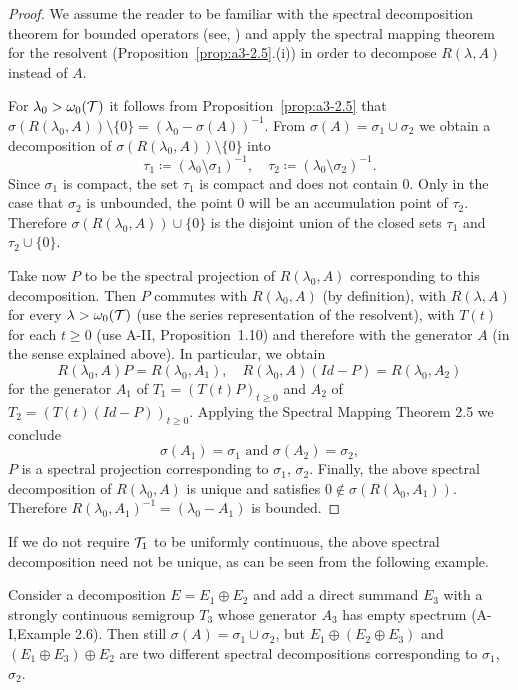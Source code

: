 \begin{proof}
We assume the reader to be familiar with the spectral decomposition theorem for bounded operators (see, \eg \citet[p.572]{dunfordschwartz:1958}) and apply the spectral mapping theorem for the resolvent (Proposition~\ref{prop:a3-2.5}.(i)) in order to decompose $R(\lambda,A)$ instead of $A$.

For $\lambda_{0} > \omega_{0}(\mathcal{T})$ it follows from Proposition~\ref{prop:a3-2.5} that $\sigma(R(\lambda_{0},A)) \setminus \{0\} = (\lambda_{0} - \sigma(A))^{-1}$.
From $\sigma(A) = \sigma_{1} \cup \sigma_{2}$ we obtain a decomposition of $\sigma(R(\lambda_{0},A)) \setminus \{0\}$ into
\[
	\tau_{1} \coloneqq (\lambda_{0} \setminus \sigma_{1})^{-1}, 
		\quad 
	\tau_{2} \coloneqq (\lambda_{0} \setminus \sigma_{2})^{-1} .
\]
Since $\sigma_{1}$ is compact, the set $\tau_{1}$ is compact and does not contain $0$.
Only in the case that $\sigma_{2}$ is unbounded, the point $0$ will be an accumulation point of $\tau_{2}$.
Therefore $\sigma(R(\lambda_{0},A)) \cup \{0\}$ is the disjoint union of the closed sets $\tau_{1}$ and $\tau_{2} \cup \{0\}$.

Take now $P$ to be the spectral projection of $R(\lambda_{0},A)$ corresponding to this decomposition.
Then $P$ commutes with $R(\lambda_{0},A)$ (by definition), with $R(\lambda,A)$ for every $\lambda > \omega_{0}(\mathcal{T})$ (use the series representation of the resolvent), with $T(t)$ for each $t \geq 0$ (use A-II, Proposition~1.10) and therefore with the generator $A$ (in the sense explained above).
In particular, we obtain
\[
R(\lambda_{0},A)P = R(\lambda_{0},A_{1}), \quad R(\lambda_{0},A)(Id-P) = R(\lambda_{0},A_{2})
\]
for the generator $A_{1}$ of $T_{1} = (T(t)P)_{t \geq 0}$ and $A_{2}$ of $T_{2} = (T(t)(Id-P))_{t \geq 0}$.
Applying the Spectral Mapping Theorem 2.5 we conclude
\[
\sigma(A_{1}) = \sigma_{1} \text{ and } \sigma(A_{2}) = \sigma_{2} ,
\]
\ie $P$ is a spectral projection corresponding to $\sigma_{1}$, $\sigma_{2}$.
Finally, the above spectral decomposition of $R(\lambda_{0},A)$ is unique and satisfies $0 \notin \sigma(R(\lambda_{0},A_{1}))$.
Therefore $R(\lambda_{0},A_{1})^{-1} = (\lambda_{0}-A_{1})$ is bounded.
\end{proof}
\begin{example*}
If we do not require $\mathcal{T}_{1}$ to be uniformly continuous, the above spectral decomposition need not be unique, as can be seen from the following example. 

Consider a decomposition $E = E_{1} \oplus E_{2}$ and add a direct summand $E_{3}$ with a strongly continuous semigroup $T_{3}$ whose generator $A_{3}$ has empty spectrum (\eg A-I,Example 2.6).
Then still $\sigma(A) = \sigma_{1} \cup \sigma_{2}$, but $E_{1} \oplus (E_{2} \oplus E_{3})$ and $(E_{1} \oplus E_{3}) \oplus E_{2}$ are two different spectral decompositions corresponding to $\sigma_{1}$, $\sigma_{2}$.
\end{example*}
